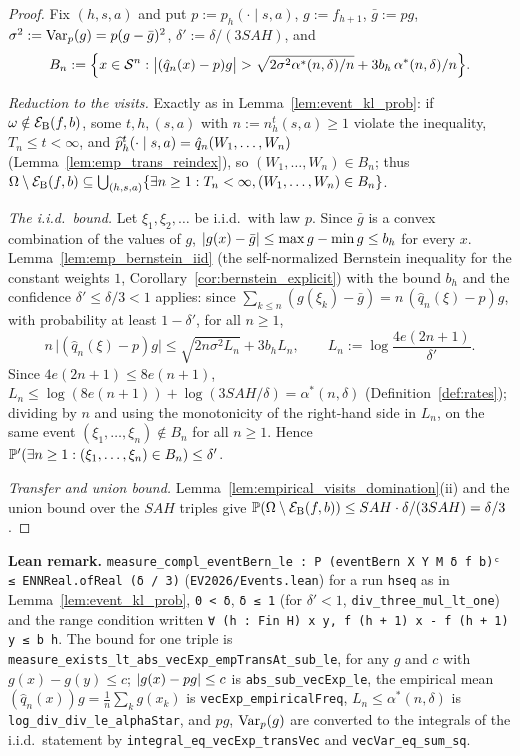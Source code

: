 \begin{proof}
\leanok
Fix $(h, s, a)$ and put $p := p_h(\cdot \mid s, a)$, $g := f_{h+1}$, $\bar g := pg$,
$\sigma^2 := \operatorname{Var}_p(g) = p(g - \bar g)^2$, $\delta' := \delta/(3SAH)$, and
\[
  B_n := \Big\{x \in \mathcal{S}^n : \big|(\hat q_n(x) - p) g\big| > \sqrt{2 \sigma^2 \alpha^*(n, \delta)/n} + 3 b_h\, \alpha^*(n, \delta)/n\Big\} .
\]

\emph{Reduction to the visits.} Exactly as in Lemma~\ref{lem:event_kl_prob}: if
$\omega \notin \mathcal{E}_{\mathrm{B}}(f, b)$, some $t, h, (s, a)$ with $n := n_h^t(s, a) \ge 1$ violate the inequality,
$T_n \le t < \infty$, and $\widehat{p}_h^t(\cdot \mid s, a) = \hat q_n(W_1, \dots, W_n)$
(Lemma~\ref{lem:emp_trans_reindex}), so $(W_1, \dots, W_n) \in B_n$; thus
$\Omega \setminus \mathcal{E}_{\mathrm{B}}(f, b) \subseteq \bigcup_{(h, s, a)} \{\exists n \ge 1 : T_n < \infty, (W_1, \dots, W_n) \in B_n\}$.

\emph{The i.i.d.\ bound.} Let $\xi_1, \xi_2, \dots$ be i.i.d.\ with law $p$. Since $\bar g$ is a
convex combination of the values of $g$, $\lvert g(x) - \bar g \rvert \le \max g - \min g \le b_h$ for every
$x$. Lemma~\ref{lem:emp_bernstein_iid} (the self-normalized Bernstein inequality for the constant
weights $1$, Corollary~\ref{cor:bernstein_explicit}) with the bound $b_h$ and the confidence
$\delta' \le \delta/3 < 1$ applies: since $\sum_{k \le n} (g(\xi_k) - \bar g) = n\,(\hat q_n(\xi) - p) g$,
with probability at least $1 - \delta'$, for all $n \ge 1$,
\[
  n\,\big|(\hat q_n(\xi) - p) g\big| \le \sqrt{2 n \sigma^2 L_n} + 3 b_h L_n,
  \qquad L_n := \log\frac{4e(2n + 1)}{\delta'} .
\]
Since $4e(2n + 1) \le 8e(n + 1)$, $L_n \le \log(8e(n + 1)) + \log(3SAH/\delta) = \alpha^*(n, \delta)$
(Definition~\ref{def:rates}); dividing by $n$ and using the monotonicity of the right-hand side
in $L_n$, on the same event $(\xi_1, \dots, \xi_n) \notin B_n$ for all $n \ge 1$. Hence
$\mathbb{P}'(\exists n \ge 1 : (\xi_1, \dots, \xi_n) \in B_n) \le \delta'$.

\emph{Transfer and union bound.} Lemma~\ref{lem:empirical_visits_domination}(ii) and the union
bound over the $SAH$ triples give $\mathbb{P}(\Omega \setminus \mathcal{E}_{\mathrm{B}}(f, b)) \le SAH \cdot \delta/(3SAH) = \delta/3$.
\end{proof}

\textbf{Lean remark.} \texttt{measure\_compl\_eventBern\_le : P (eventBern X Y M δ f b)ᶜ ≤ ENNReal.ofReal (δ / 3)}
(\texttt{EV2026/Events.lean}) for a run \texttt{hseq} as in Lemma~\ref{lem:event_kl_prob},
\texttt{0 < δ}, \texttt{δ ≤ 1} (for $\delta' < 1$, \texttt{div\_three\_mul\_lt\_one}) and the range
condition written \texttt{∀ (h : Fin H) x y, f (h + 1) x - f (h + 1) y ≤ b h}. The bound for one triple is
\texttt{measure\_exists\_lt\_abs\_vecExp\_empTransAt\_sub\_le}, for any $g$ and $c$ with
$g(x) - g(y) \le c$; $\lvert g(x) - pg \rvert \le c$ is \texttt{abs\_sub\_vecExp\_le}, the empirical mean
$(\hat q_n(x)) g = \frac1n \sum_k g(x_k)$ is \texttt{vecExp\_empiricalFreq}, $L_n \le \alpha^*(n, \delta)$ is
\texttt{log\_div\_div\_le\_alphaStar}, and $pg$, $\operatorname{Var}_p(g)$ are converted to the integrals of the
i.i.d.\ statement by \texttt{integral\_eq\_vecExp\_transVec} and \texttt{vecVar\_eq\_sum\_sq}.

